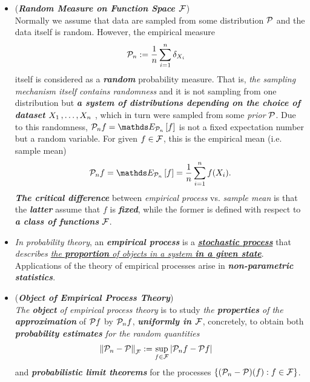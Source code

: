 \documentclass[11pt]{article}
\begin{document}
\begin{itemize}
\item \begin{remark}(\textbf{\emph{Random Measure on Function Space ${\mathcal F}$}})\\
Normally we assume that data are sampled from some distribution ${\mathcal P}$ and the data itself is random. However, the empirical measure 
\begin{align*}
{\mathcal P}_n &:= \frac{1}{n}\sum_{i=1}^{n}\delta_{X_i}
\end{align*} itself is considered as a \emph{\textbf{random}} probability measure. That is, \emph{the sampling mechanism itself contains randomness} and it is not sampling from one distribution but \emph{\textbf{a system of distributions depending on the choice of dataset $X_1 \,{,}\ldots{,}\, X_n$ }}, which in turn were sampled from some \emph{prior} ${\mathcal P}$. Due to this randomness, $\cP_n f = \E{\cP_n}{f}$ is not a fixed expectation number but a random variable. For given $f\in {\mathcal F}$, this is the empirical mean (i.e. sample mean)
\begin{align*}
\cP_n f = \E{\cP_n}{f} = \frac{1}{n}\sum_{i=1}^n f(X_i).
\end{align*} \emph{\textbf{The critical difference}} between \emph{empirical process} vs. \emph{sample mean} is that the \emph{\textbf{latter}} assume that  $f$ is \emph{\textbf{fixed}}, while the former is defined with respect to \emph{\textbf{a class of functions}} ${\mathcal F}$.
\end{remark}

\item \begin{remark}
\emph{In probability theory}, an \emph{\textbf{empirical process}} is a \underline{\emph{\textbf{stochastic process}}} that \emph{describes \underline{the \textbf{proportion} of objects in a system \textbf{in a given state}}}.  Applications of the theory of empirical processes arise in \emph{\textbf{non-parametric statistics}}.
\end{remark}

\item \begin{remark} (\emph{\textbf{Object of Empirical Process Theory}}) \\
\emph{The \textbf{object} of empirical process theory} is to study \emph{the \textbf{properties} of the \textbf{approximation}} of ${\mathcal P} f$ by ${\mathcal P}_n f$, \emph{\textbf{uniformly in ${\mathcal F}$}}, concretely, to obtain both \emph{\textbf{probability estimates} for the random quantities}
\begin{align*}
\left\|{\mathcal P}_n  - {\mathcal P}\right\|_{{\mathcal F}} &:= \sup_{f \in {\mathcal F}}\left\lvert {\mathcal P}_n f - {\mathcal P} f \right\rvert
\end{align*}
and \emph{\textbf{probabilistic limit theorems}} for the processes $\left\{ ({\mathcal P}_n - {\mathcal P})(f) : f \in {\mathcal F}\right\}$.


\end{remark}
\end{itemize}
\end{document}
